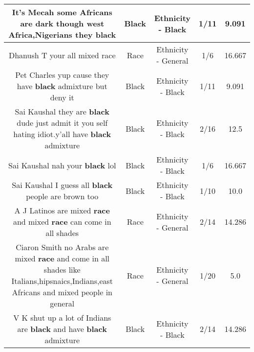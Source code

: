 \documentclass[11pt]{article}
\newlength\mylength
\begin{document}
\begin{center}
\begin{longtable}{|C{.65\mylength}|C{.30\mylength}|C{.12\mylength}|C{.12\mylength}|C{.12\mylength}|}
  \small It's Mecah some Africans are dark though west Africa,Nigerians they black\normalsize   & Black & Ethnicity - Black & 1/11 & 9.091 \\  \hline
  \small Dhanush T  your all mixed race\normalsize   & Race & Ethnicity - General & 1/6 & 16.667 \\  \hline
  \small Pet Charles yup cause they have \textbf{black} admixture but deny it\normalsize   & Black & Ethnicity - Black & 1/11 & 9.091 \\  \hline
  \small Sai Kaushal they are \textbf{black} dude just admit it you self hating idiot.y'all have \textbf{black} admixture\normalsize   & Black & Ethnicity - Black & 2/16 & 12.5 \\  \hline
  \small Sai Kaushal nah your \textbf{black} lol\normalsize   & Black & Ethnicity - Black & 1/6 & 16.667 \\  \hline
  \small Sai Kaushal I guess all \textbf{black} people are brown too\normalsize   & Black & Ethnicity - Black & 1/10 & 10.0 \\  \hline
  \small A J Latinos are mixed \textbf{race} and mixed \textbf{race} can come in all shades\normalsize   & Race & Ethnicity - General & 2/14 & 14.286 \\  \hline
  \small Ciaron Smith no Arabs are mixed \textbf{race} and come in all shades like Italians,hipsnaics,Indians,east Africans and mixed people in general\normalsize   & Race & Ethnicity - General & 1/20 & 5.0 \\  \hline
  \small V K shut up a lot of Indians are \textbf{black} and have \textbf{black} admixture\normalsize   & Black & Ethnicity - Black & 2/14 & 14.286 \\  \hline

\end{longtable}
\end{center}
\end{document}
